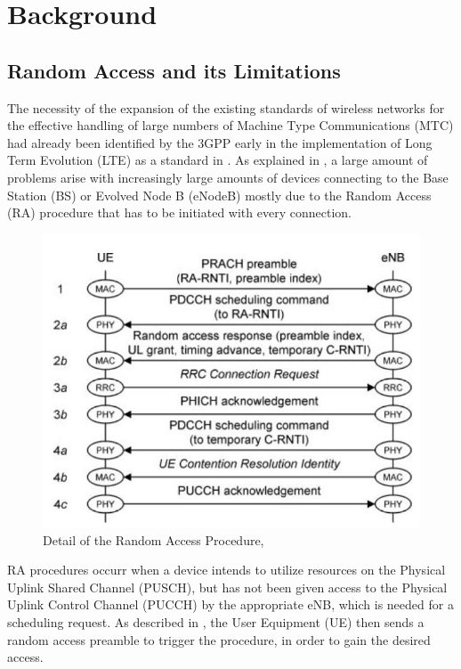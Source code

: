 \chapter{Background}

\section{Random Access and its Limitations}
The necessity of the expansion of the existing standards of wireless networks for the effective handling of large numbers of Machine Type Communications (MTC) had already been identified by the 3GPP early in the implementation of Long Term Evolution (LTE) as a standard in \cite{3rdGenerationPartnershipProject;2011}. As explained in \cite{Laya2014}, a large amount of problems arise with increasingly large amounts of devices connecting to the Base Station (BS) or Evolved Node B (eNodeB) mostly due to the Random Access (RA) procedure that has to be initiated with every connection.

\begin{figure}[!h]
\centering
\includegraphics[scale = 0.45]{figures/Random_Access_Procedure}
\caption{Detail of the Random Access Procedure, \cite{Cox2012}}
\end{figure}

RA procedures occurr when a device intends to utilize resources on the Physical Uplink Shared Channel (PUSCH), but has not been given access to the Physical Uplink Control Channel (PUCCH) by the appropriate eNB, which is needed for a scheduling request. As described in \cite{Cox2012}, the User Equipment (UE) then sends a random access preamble to trigger the procedure, in order to gain the desired access.

